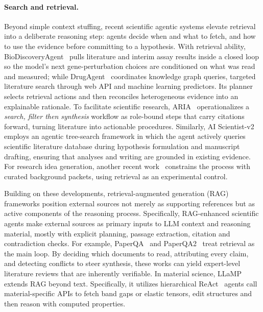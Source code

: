 \paragraph{Search and retrieval.}

\label{sec:app-science-search}



Beyond simple context stuffing, recent scientific agentic systems elevate retrieval into a deliberate reasoning step: agents decide when and what to fetch, and how to use the evidence before committing to a hypothesis. With retrieval ability, BioDiscoveryAgent~\cite{roohani2025biodiscoveryagentaiagentdesigning} pulls literature and interim assay results inside a closed loop so the model’s next gene-perturbation choices are conditioned on what was read and measured; while DrugAgent~\cite{inoue2025drugagentexplainabledrugrepurposing} coordinates knowledge graph queries, targeted literature search through web API and machine learning predictors. Its planner selects retrieval actions and then reconciles heterogeneous evidence into an explainable rationale. To facilitate scientific research, ARIA~\cite{ramirezmedina2025acceleratingscientificresearchmultillm} operationalizes a \textit{search, filter then synthesis} workflow as role-bound steps that carry citations forward, turning literature into actionable procedures. Similarly, AI Scientist-v2~\cite{yamada2025ai} employs an agentic tree-search framework in which the agent actively queries scientific literature database during hypothesis formulation and manuscript drafting, ensuring that analyses and writing are grounded in existing evidence. For research idea generation, another recent work~\cite{qi2023largelanguagemodelszero} constrains the process with curated background packets, using retrieval as an experimental control.


Building on these developments, retrieval-augmented generation (RAG) frameworks position external sources not merely as supporting references but as active components of the reasoning process. Specifically, RAG-enhanced scientific agents make external sources as primary inputs to LLM context and reasoning material, mostly with explicit planning, passage extraction, citation and contradiction checks. For example, PaperQA~\cite{lála2023paperqaretrievalaugmentedgenerativeagent} and PaperQA2~\cite{skarlinski2024languageagentsachievesuperhuman} treat retrieval as the main loop. By deciding which documents to read, attributing every claim, and detecting conflicts to steer synthesis, these works can yield expert-level literature reviews that are inherently verifiable. In material science, LLaMP~\cite{chiang2024llamp} extends RAG beyond text. Specifically, it utilizes  hierarchical ReAct~\cite{yao2023react} agents call material-specific APIs to fetch band gaps or elastic tensors, edit structures and then reason with computed properties.



